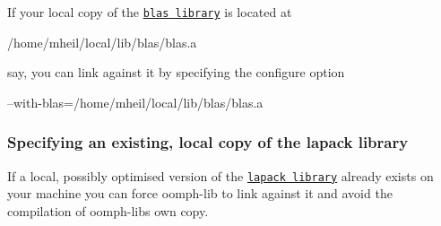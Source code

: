 If your local copy of the \href{http://netlib.org/blas}{\tt blas library} is located at 
\begin{DoxyCode}
/home/mheil/local/lib/blas/blas.a
\end{DoxyCode}
 say, you can link against it by specifying the configure option 
\begin{DoxyCode}
--with-blas=/home/mheil/local/lib/blas/blas.a
\end{DoxyCode}
\hypertarget{index_lapack}{}\subsubsection{Specifying an existing, local copy of the lapack library}\label{index_lapack}
If a local, possibly optimised version of the \href{http://netlib.org/lapack}{\tt lapack library} already exists on your machine you can force {\ttfamily oomph-\/lib} to link against it and avoid the compilation of {\ttfamily oomph-\/lib\textquotesingle{}s} own copy.

